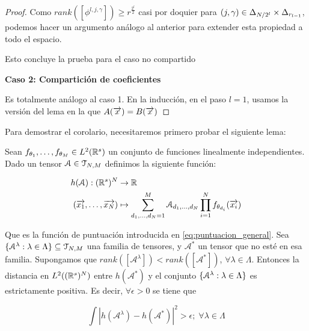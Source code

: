 \begin{proof}
    Como $rank([\phi^{l, j, \gamma}]) \geq r^{\frac{2^l}{2}}$ casi por doquier para $(j, \gamma) \in \Delta_{N/2^l} \times \Delta_{r_{l-1}}$, podemos hacer un argumento análogo al anterior para extender esta propiedad a todo el espacio.

    Esto concluye la prueba para el caso no compartido

    \textbf{Caso 2: Compartición de coeficientes}

    Es totalmente análogo al caso 1. En la inducción, en el paso $l = 1$, usamos la versión del lema  en la que $A(\overrightarrow{x}) = B(\overrightarrow{x})$
\end{proof}

Para demostrar el corolario, necesitaremos primero probar el siguiente lema:

\begin{lema}
    Sean $f_{\theta_1}, \ldots, f_{\theta_M} \in L^2(\mathbb{R}^s)$ un conjunto de funciones linealmente independientes. Dado un tensor $\mathcal{A} \in \mathcal{T}_{N, M}$ definimos la siguiente función:

    \begin{equation}
    \begin{split}
        h(\mathcal{A}): (\mathbb{R}^s)^N &\to \mathbb{R} \\
        (\overrightarrow{x_1}, \ldots, \overrightarrow{x_N}) &\mapsto \sum_{d_1, \ldots, d_N = 1}^M \mathcal{A}_{d_1, \ldots, d_N} \prod_{i = 1}^N f_{\theta_{d_i}}(\overrightarrow{x_i})
    \end{split}
    \end{equation}

    Que es la función de puntuación introducida en \eqref{eq:puntuacion_general}. Sea $\{ \mathcal{A}^\lambda: \lambda \in \Lambda \} \subseteq \mathcal{T}_{N, M}$ una familia de tensores, y $\mathcal{A}^*$ un tensor que no esté en esa familia. Supongamos que $rank([\mathcal{A}^\lambda]) < rank([\mathcal{A}^*])$, $\forall \lambda \in \Lambda$. Entonces la distancia en $L^2((\mathbb{R}^s)^N)$ entre $h(\mathcal{A}^*)$ y el conjunto $\{ \mathcal{A}^\lambda: \lambda \in \Lambda \}$ es estrictamente positiva. Es decir, $\forall \epsilon > 0$ se tiene que

    \begin{equation}
        \int |h(\mathcal{A}^\lambda) - h(\mathcal{A}^*)|^2 > \epsilon; \; \forall \lambda \in \Lambda
    \end{equation}
\end{lema}

